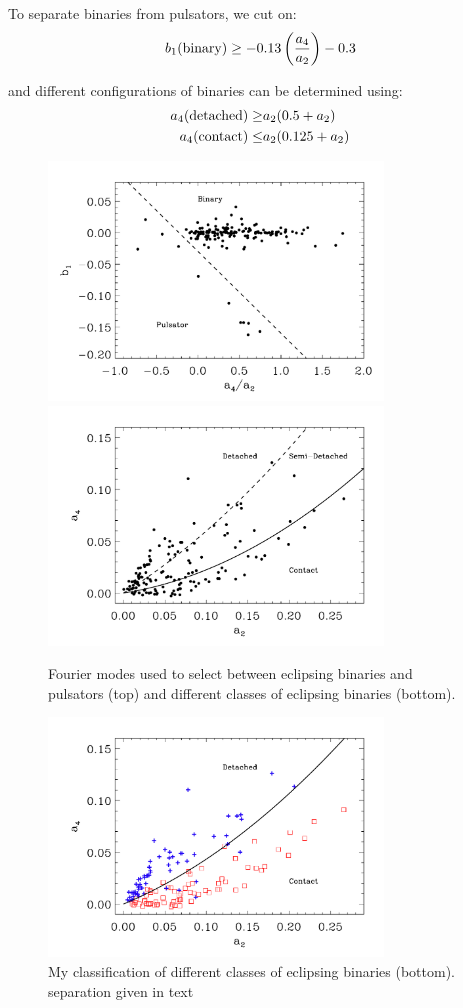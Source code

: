 \documentclass[]{emulateapj}
\begin{document}
To separate binaries from pulsators, we cut on:
\begin{equation}
b_1({\rm binary}) \ge  -0.13\left( \frac{a_4}{a_2} \right)- 0.3
\end{equation}

and different configurations of binaries can be determined using:
\begin{eqnarray}
a_4({\rm detached}) \ge & a_2(0.5 + a_2)\\
a_4({\rm contact}) \le & a_2(0.125 + a_2)
\end{eqnarray}

\begin{figure}[]
\centering
\includegraphics[width=3.5in]{new_plots/four_a42b1}
\includegraphics[width=3.5in]{new_plots/four_a2a4}
\caption{Fourier modes used to select between eclipsing binaries and pulsators (top) and different classes of eclipsing binaries (bottom).}
\label{four_bb}
\end{figure}


\begin{figure}[]
\centering
\includegraphics[width=3.5in]{new_plots/four_a2a4_jrad}
\caption{My classification of different classes of eclipsing binaries (bottom). separation given in text}
\label{four_bb2}
\end{figure}
\end{document}
